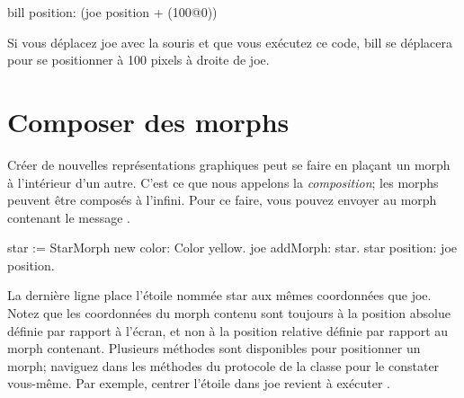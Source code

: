 \documentclass[a4paper,10pt,twoside]{book}
\begin{document}
\begin{code}{}
bill position: (joe position + (100@0))
\end{code}
\noindent

Si vous d\'eplacez joe avec la souris et que vous ex\'ecutez ce code,
bill se d\'eplacera pour se positionner \`a 100 pixels \`a droite de joe.

\section{Composer des morphs}

Cr\'eer de nouvelles repr\'esentations graphiques peut se faire en
pla\c{c}ant un morph \`a l'int\'erieur d'un autre. C'est ce que nous
appelons la \emph{composition}; les morphs peuvent \^etre compos\'es
\`a l'infini. %
Pour ce faire, vous pouvez envoyer au morph contenant le message
. %
%

\begin{code}{}
star := StarMorph new color: Color yellow.
joe addMorph: star.
star position: joe position.
\end{code}

\noindent
La derni\`ere ligne place l'\'etoile nomm\'ee star aux m\^emes
coordonn\'ees que joe. Notez que les coordonn\'ees du morph
contenu sont toujours \`a la position absolue d\'efinie par rapport
\`a l'\'ecran, et non \`a la position relative d\'efinie par rapport
au morph contenant.
Plusieurs m\'ethodes sont disponibles pour positionner un morph;
naviguez dans les m\'ethodes du protocole  de la
classe  pour le constater vous-m\^eme.
Par exemple, centrer l'\'etoile dans joe revient \`a ex\'ecuter
  .
\end{document}
